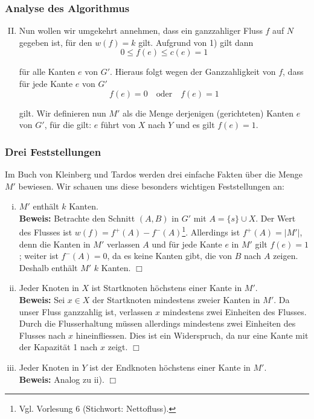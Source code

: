 \documentclass[smaller]{beamer}
\begin{document}
\begin{frame}
\frametitle{Analyse des Algorithmus}
\begin{enumerate}[I)]
\setcounter{enumi}{1}
\item Nun wollen wir umgekehrt annehmen, dass ein ganzzahliger Fluss $f$ auf $N$ gegeben ist, für den $w(f)=k$ gilt. Aufgrund von 1) gilt dann
\[
0 \leq f(e) \leq c(e) = 1
\]

für alle Kanten $e$ von $G'$. Hieraus folgt wegen der Ganzzahligkeit von $f$, dass für jede Kante $e$ von $G'$
\[
f(e) = 0 \quad \text{oder} \quad f(e) = 1
\]

gilt. Wir definieren nun $M'$ als die Menge derjenigen (gerichteten) Kanten $e$ von $G'$, für die gilt: $e$ führt von $X$ nach $Y$ und es gilt $f(e)=1$. 
\end{enumerate}
\end{frame}

\begin{frame}
 \frametitle{Drei Feststellungen}
 Im Buch von Kleinberg und Tardos werden drei einfache Fakten über die Menge $M'$ bewiesen. Wir schauen uns diese besonders wichtigen Feststellungen an: \\ \vspace*{0.2cm}

\begin{enumerate}[i)]
\item \alert{$M'$ enthält $k$ Kanten.} \\

\textbf{Beweis:} Betrachte den Schnitt $(A, B)$ in $G'$ mit $A = \big\{s\big\} \cup X$. Der Wert des Flusses ist $w(f) = f^+(A) - f^-(A)$\footnote{Vgl. Vorlesung 6 (Stichwort: \alert{Nettofluss}).}. Allerdings ist $f^+(A) = |M'|$, denn die Kanten in $M'$ verlassen $A$ und für jede Kante $e$ in $M'$ gilt $f(e) = 1$; weiter ist $f^-(A) = 0$, da es keine Kanten gibt, die von $B$ nach $A$ zeigen. Deshalb enthält $M'$ $k$ Kanten. \qquad $\Box$

\item \alert{Jeder Knoten in $X$ ist Startknoten höchstens einer Kante in $M'$.} \\

\textbf{Beweis:} Sei $x \in X$ der Startknoten mindestens zweier Kanten in $M'$. Da unser Fluss ganzzahlig ist, verlassen $x$ mindestens zwei Einheiten des Flusses. Durch die Flusserhaltung müssen allerdings mindestens zwei Einheiten des Flusses nach $x$ hineinfliessen. Dies ist ein Widerspruch, da nur eine Kante mit der Kapazität 1 nach $x$ zeigt. \qquad $\Box$

\item \alert{Jeder Knoten in $Y$ ist der Endknoten höchstens einer Kante in $M'$.} \\
\textbf{Beweis:} Analog zu ii). \qquad $\Box$
\end{enumerate}
\end{frame}
\end{document}
